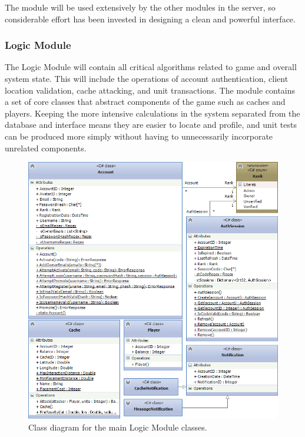 The module will be used extensively by the other modules in the server, so considerable effort has been invested in designing a clean and powerful interface.

\subsubsection{Logic Module}
The Logic Module will contain all critical algorithms related to game and overall system state. This will include the operations of account authentication, client location validation, cache attacking, and unit transactions. The module contains a set of core classes that abstract components of the game such as caches and players. Keeping the more intensive calculations in the system separated from the database and interface means they are easier to locate and profile, and unit tests can be produced more simply without having to unnecessarily incorporate unrelated components.

\begin{figure}[h!]
    \centering
    \includegraphics[width=\textwidth]{svlogiccd}
    \caption{Class diagram for the main Logic Module classes.}
\end{figure}

